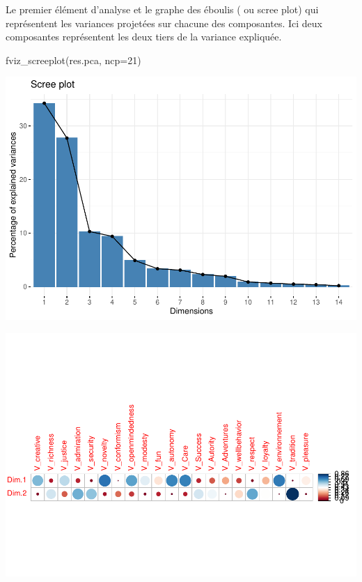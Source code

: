 \documentclass[
]{book}
\newenvironment{Shaded}{\begin{snugshade}}{\end{snugshade}}
\newcommand{\AttributeTok}[1]{\textcolor[rgb]{0.77,0.63,0.00}{#1}}
\newcommand{\ConstantTok}[1]{\textcolor[rgb]{0.00,0.00,0.00}{#1}}
\newcommand{\DecValTok}[1]{\textcolor[rgb]{0.00,0.00,0.81}{#1}}
\newcommand{\FloatTok}[1]{\textcolor[rgb]{0.00,0.00,0.81}{#1}}
\newcommand{\FunctionTok}[1]{\textcolor[rgb]{0.00,0.00,0.00}{#1}}
\newcommand{\NormalTok}[1]{#1}
\newcommand{\SpecialCharTok}[1]{\textcolor[rgb]{0.00,0.00,0.00}{#1}}
\newcommand{\StringTok}[1]{\textcolor[rgb]{0.31,0.60,0.02}{#1}}
\begin{document}
Le premier élément d'analyse et le graphe des éboulis ( ou scree plot) qui représentent les variances projetées sur chacune des composantes. Ici deux composantes représentent les deux tiers de la variance expliquée.

\begin{Shaded}
\begin{Highlighting}[]
\FunctionTok{fviz\_screeplot}\NormalTok{(res.pca, }\AttributeTok{ncp=}\DecValTok{21}\NormalTok{)}
\end{Highlighting}
\end{Shaded}

\includegraphics{bookdown-demo_files/figure-latex/0608-1.pdf}

\begin{Shaded}
\end{Shaded}

\includegraphics{bookdown-demo_files/figure-latex/0609-1.pdf}
\end{document}

